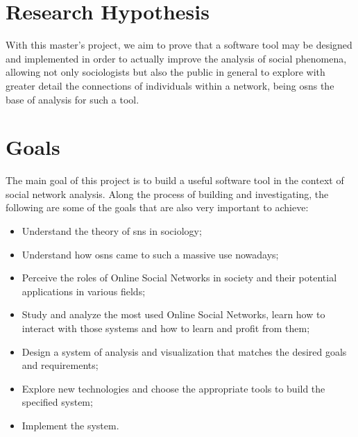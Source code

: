 \section{Research Hypothesis}
With this master's project, we aim to prove that a software tool may be designed and implemented in order to actually improve the analysis of social phenomena, allowing not only sociologists but also the public in general to explore with greater
detail the connections of individuals within a network, being \glspl{osn} the base of analysis for such a tool.

\section{Goals}

The main goal of this project is to build a useful software tool in the context of social network analysis. Along the process of building and investigating, the following are some of the goals that are also very important to achieve:

\begin{itemize}
\item Understand the theory of \glspl{sn} in sociology;
\item Understand how \glspl{osn} came to such a massive use nowadays;
\item Perceive the roles of Online Social Networks in society and their potential applications in various fields;
\item Study and analyze the most used Online Social Networks, learn how to interact with those systems and how to learn and profit from them;
\item Design a system of analysis and visualization that matches the desired goals and requirements;
\item Explore new technologies and choose the appropriate tools to build the specified system;
\item Implement the system.
\end{itemize}

